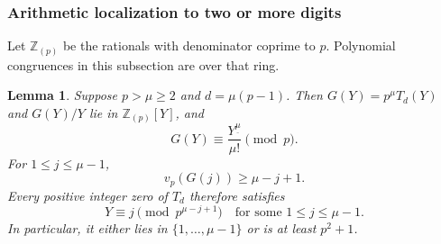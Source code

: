 \documentclass[11pt,a4paper]{article}
\numberwithin{equation}{section}
\newtheorem{lemma}[theorem]{Lemma}
\theoremstyle{definition}
\theoremstyle{remark}
\theoremstyle{plain}
\newcommand{\Z}{\mathbb Z}
\newcommand{\fall}[2]{#1^{\underline{#2}}}
\begin{document}
\subsubsection{Arithmetic localization to two or more digits}

Let $\Z_{(p)}$ be the rationals with denominator coprime to $p$. Polynomial
congruences in this subsection are over that ring.

\begin{lemma}\label{xx:pm:localization}
Suppose $p>\mu\ge2$ and $d=\mu(p-1)$. Then $G(Y)=p^\mu T_d(Y)$ and $G(Y)/Y$ lie
in $\Z_{(p)}[Y]$, and
\begin{equation}\label{xx:pm:congruence}
 G(Y)\equiv\frac{\fall Y\mu}{\mu!}\pmod p.
\end{equation}
For $1\le j\le \mu-1$,
\begin{equation}\label{xx:pm:smallvalues}
 v_p(G(j))\ge \mu-j+1.
\end{equation}
Every positive integer zero of $T_d$ therefore satisfies
\begin{equation}\label{xx:pm:digits}
 Y\equiv j\pmod{p^{\mu-j+1}}\quad\text{for some }1\le j\le \mu-1.
\end{equation}
In particular, it either lies in $\{1,\ldots,\mu-1\}$ or is at least $p^2+1$.
\end{lemma}
\end{document}
